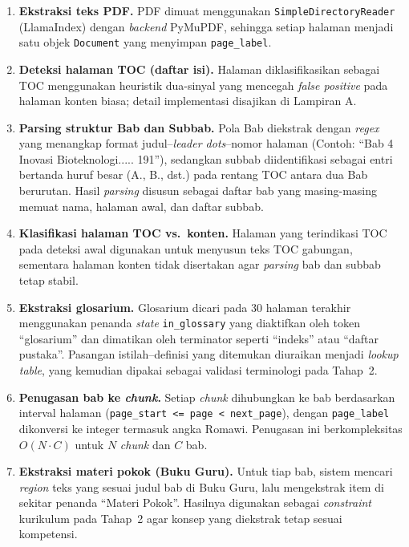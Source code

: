 \documentclass[main]{subfiles}
\begin{document}
\begin{enumerate}
  \item \textbf{Ekstraksi teks PDF.} PDF dimuat menggunakan
        \texttt{SimpleDirectoryReader} (LlamaIndex) dengan \textit{backend}
        PyMuPDF, sehingga setiap halaman menjadi satu objek \texttt{Document}
        yang menyimpan \texttt{page\_label}.

  \item \textbf{Deteksi halaman TOC (daftar isi).} Halaman diklasifikasikan
        sebagai TOC menggunakan heuristik dua-sinyal yang mencegah
        \textit{false positive} pada halaman konten biasa; detail
        implementasi disajikan di Lampiran A.

  \item \textbf{Parsing struktur Bab dan Subbab.} Pola Bab diekstrak dengan
        \textit{regex} yang menangkap format judul--\textit{leader dots}--nomor
        halaman (Contoh: ``Bab 4 Inovasi Bioteknologi..... 191''), sedangkan
        subbab diidentifikasi sebagai entri bertanda huruf besar (A., B., dst.)
        pada rentang TOC antara dua Bab berurutan. Hasil \textit{parsing}
        disusun sebagai daftar bab yang masing-masing memuat nama, halaman
        awal, dan daftar subbab.

  \item \textbf{Klasifikasi halaman TOC vs.\ konten.} Halaman yang terindikasi
        TOC pada deteksi awal digunakan untuk menyusun teks TOC gabungan,
        sementara halaman konten tidak disertakan agar \textit{parsing} bab dan
        subbab tetap stabil.

  \item \textbf{Ekstraksi glosarium.} Glosarium dicari pada 30 halaman terakhir
        menggunakan penanda \textit{state} \texttt{in\_glossary} yang diaktifkan
        oleh token ``glosarium'' dan dimatikan oleh terminator seperti
        ``indeks'' atau ``daftar pustaka''. Pasangan istilah--definisi yang
        ditemukan diuraikan menjadi \textit{lookup table}, yang kemudian dipakai
        sebagai validasi terminologi pada Tahap~2.

  \item \textbf{Penugasan bab ke \textit{chunk}.} Setiap \textit{chunk}
        dihubungkan ke bab berdasarkan interval halaman
        (\texttt{page\_start <= page < next\_page}), dengan \texttt{page\_label}
        dikonversi ke integer termasuk angka Romawi. Penugasan ini
        berkompleksitas $O(N \cdot C)$ untuk $N$ \textit{chunk} dan $C$ bab.

  \item \textbf{Ekstraksi materi pokok (Buku Guru).} Untuk tiap bab, sistem
        mencari \textit{region} teks yang sesuai judul bab di Buku Guru, lalu
        mengekstrak item di sekitar penanda ``Materi Pokok''. Hasilnya
        digunakan sebagai \textit{constraint} kurikulum pada Tahap~2 agar konsep
        yang diekstrak tetap sesuai kompetensi.
\end{enumerate}
\end{document}
